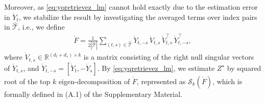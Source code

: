 \documentclass[12pt]{article}
\newcommand{\mytrans}{\top}
\begin{document}
Moreover,  
as \eqref{eq:yqretrievez_lm} 
cannot hold exactly due to the estimation error in $\mathring{Y}_t$, 
we stabilize the result by  investigating the averaged terms over index pairs in $\hat{\mathcal{T}}$, i.e., we define 
\begin{align}\label{eq:gringdef}
    \mathring{F} =\frac{1}{2|\hat{\mathcal{T}} |} \sum_{(t,s)\in \hat{\mathcal{T}}}  \mathring Y_{t,-s} \, \mathring V_{t,s} \, \mathring  V_{t,s}^\mytrans \, \mathring Y_{t,-s}^{\mytrans}, 
\end{align}
where $\mathring{V}_{t,s}\in \mathbb{R}^{(d_t+d_s) \times k}$ is a matrix  consisting of the right null singular vectors of $\mathring Y_{t,s} $, and $\mathring Y_{t,-s} = [\mathring Y_{t}, -\mathring Y_{s}].$
By \eqref{eq:yqretrievez_lm},  we estimate $Z^{\star}$ by squared root of the top $k$ eigen-decomposition of $\mathring{F}$, represented as $\mathcal{S}_k(\mathring{F})$, which is formally defined in  (A.1) of the Supplementary Material. 







\end{document}
